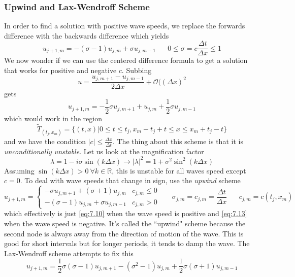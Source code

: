 \documentclass{article}
\newcommand{\R}{\mathbb{R}}
\newcommand{\twen}{\hspace{20pt}}
\numberwithin{equation}{section}
\begin{document}
\subsubsection{Upwind and Lax-Wendroff Scheme}
In order to find a solution with positive wave speeds, we replace the forwards difference with the backwards difference which yields 
\begin{equation}
    u_{j+1,m}=-(\sigma -1)u_{j,m} + \sigma u_{j,m-1} \twen 0\leq\sigma =c\frac{\Delta t}{\Delta x} \leq1 \label{eq:7.13}
\end{equation}
We now wonder if we can use the centered difference formula to get a solution that works for positive and negative $c$. Subbing 
\begin{equation*}
    u=\frac{u_{j,m+1}-u_{j,m-1}}{2\Delta x} + \mathcal{O}((\Delta x)^2 
\end{equation*}
gets 
\begin{equation}
    u_{j+1,m} = -\frac{1}{2}\sigma u_{j,m+1}+u_{j,m}+\frac{1}{2}\sigma u_{j,m-1}
\end{equation}
which would work in the region 
\begin{equation*}
    \tilde T_{(t_j,x_m)} = \{ (t,x) \big| 0 \leq t\leq t_j, x_m-t_j+t\leq x\leq x_m+t_j-t\}
\end{equation*}
and we have the condition $|c|\leq \frac{\Delta x}{\Delta t}$. The thing about this scheme is that it is \emph{unconditionally unstable}. Let us look at the magnification factor 
\begin{equation*}
    \lambda =1-i\sigma \sin(k\Delta x) \rightarrow |\lambda |^2=1+\sigma^2\sin^2(k\Delta x)
\end{equation*}
Assuming $\sin (k\Delta x) >0 \ \forall k\in \R$, this is unstable for all waves speed except $c=0$. To deal with wave speeds that change in sign, use the \emph{upwind} scheme 
\begin{equation*}
    u_{j+1,m} = \begin{cases}
        -\sigma u_{j,m+1}+(\sigma +1)u_{j,m} &c_{j,m} \leq 0 \\ -(\sigma -1)u_{j,m} + \sigma u_{j,m-1} &c_{j,m}>0
    \end{cases} 
    \twen \sigma_{j,m}=c_{j,m}=\frac{\Delta t}{\Delta x} \twen c_{j,m}=c(t_j,x_m)
\end{equation*}
which effectively is just \eqref{eq:7.10} when the wave speed is positive and \eqref{eq:7.13} when the wave speed is negative. It's called the ``upwind" scheme because the second node is always away from the direction of motion of the wave. This is good for short intervals but for longer periods, it tends to damp the wave. The Lax-Wendroff scheme attempts to fix this 
\begin{equation}
    u_{j+1,m}=\frac{1}{2}\sigma (\sigma -1)u_{j,m+1} - (\sigma^2-1)u_{j,m}+\frac{1}{2}\sigma(\sigma+1)u_{j,m-1}
\end{equation}
\end{document}
